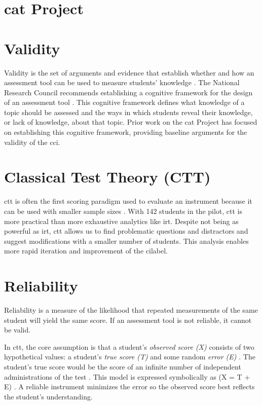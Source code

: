 \iflong

\section{\gls{cat} Project}


\fi

\section{Validity}

Validity is the set of arguments and evidence that establish whether and how an assessment tool can be used to measure students' knowledge \cite{douglas_purzer}. The National Research Council recommends establishing a cognitive framework for the design of an assessment tool \cite{knowing_what_students_know}. This cognitive framework defines what knowledge of a topic should be assessed and the ways in which students reveal their knowledge, or lack of knowledge, about that topic. Prior work on the \gls{cat} Project has focused on establishing this cognitive framework, providing baseline arguments for the validity of the \gls{cci}.



\section{Classical Test Theory (CTT)}


\gls{ctt} is often the first scoring paradigm used to evaluate an instrument because it can be used with smaller sample sizes \cite{og_ctt}. With 142 students in the pilot, \gls{ctt} is more practical than more exhaustive analytics like \gls{irt}. Despite not being as powerful as \gls{irt}, \gls{ctt} allows us to find problematic questions and distractors and suggest modifications with a smaller number of students. This analysis enables more rapid iteration and improvement of the \gls{cilabel}.

\section{Reliability}


Reliability is a measure of the likelihood that repeated measurements of the same student will yield the same score. If an assessment tool is not reliable, it cannot be valid.

In \gls{ctt}, the core assumption is that a student's \textit{observed score (X)} consists of two hypothetical values: a student's \textit{true score (T)} and some random \textit{error (E)} \cite{og_ctt}. The student's true score would be the score of an infinite number of independent administrations of the test \cite{true_score}.  This model is expressed symbolically as (X = T + E) \cite{dlci}. A reliable instrument minimizes the error so the observed score best reflects the student's understanding. 

